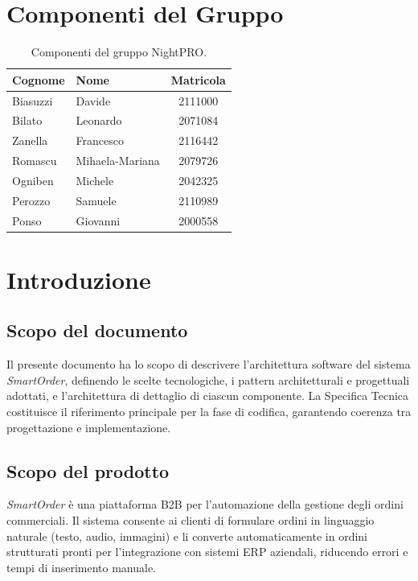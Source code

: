 \documentclass[a4paper, 11pt, oneside]{scrartcl}
\begin{document}
\section*{Componenti del Gruppo}

\begin{table}[H]
    \centering
    \renewcommand{\arraystretch}{1.2}
    \begin{tabular}{@{}llc@{}}
        \toprule
        \textbf{Cognome} & \textbf{Nome}   & \textbf{Matricola} \\
        \midrule
        Biasuzzi         & Davide          & 2111000            \\
        Bilato           & Leonardo        & 2071084            \\
        Zanella          & Francesco       & 2116442            \\
        Romascu          & Mihaela-Mariana & 2079726            \\
        Ogniben          & Michele         & 2042325            \\
        Perozzo          & Samuele         & 2110989            \\
        Ponso            & Giovanni        & 2000558            \\
        \bottomrule
    \end{tabular}
    \caption{Componenti del gruppo NightPRO.}
\end{table}

\newpage
\section{Introduzione}

\subsection{Scopo del documento}
Il presente documento ha lo scopo di descrivere l'architettura software del sistema \textit{SmartOrder}, definendo le scelte tecnologiche, i pattern architetturali e progettuali adottati, e l'architettura di dettaglio di ciascun componente.
La Specifica Tecnica costituisce il riferimento principale per la fase di codifica, garantendo coerenza tra progettazione e implementazione.

\subsection{Scopo del prodotto}
\textit{SmartOrder} \`e una piattaforma B2B per l'automazione della gestione degli ordini commerciali. Il sistema consente ai clienti di formulare ordini in linguaggio naturale (testo, audio, immagini) e li converte automaticamente in ordini strutturati pronti per l'integrazione con sistemi ERP aziendali, riducendo errori e tempi di inserimento manuale.
\end{document}
